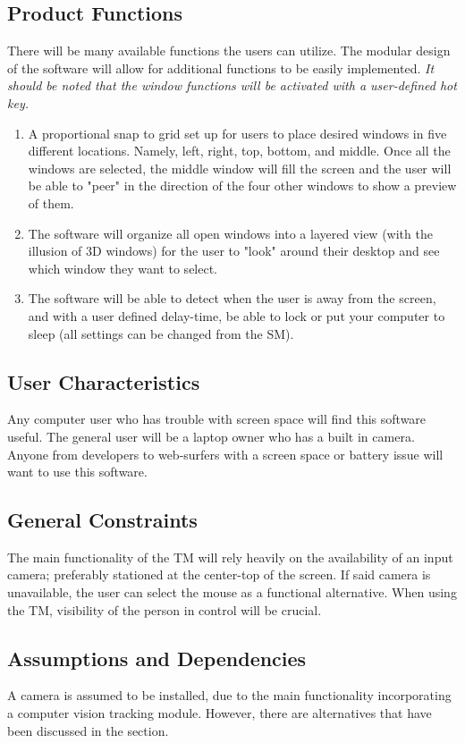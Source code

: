 \documentclass[titlepage]{article}
\begin{document}
\subsection{Product Functions}
There will be many available functions the users can utilize. The modular design of the software will allow for additional functions to be easily implemented. \textit{It should be noted that the window functions will be activated with a user-defined hot key.}
\begin{enumerate}
	\item A proportional snap to grid set up for users to place desired windows in five different locations. Namely, left, right, top, bottom, and middle. Once all the windows are selected, the middle window will fill the screen and the user will be able to "peer" in the direction of the four other windows to show a preview of them. 
	\item The software will organize all open windows into a layered view (with the illusion of 3D windows) for the user to "look" around their desktop and see which window they want to select.
	\item The software will be able to detect when the user is away from the screen, and with a user defined delay-time, be able to lock or put your computer to sleep (all settings can be changed from the SM).
\end{enumerate}

\subsection{User Characteristics}
Any computer user who has trouble with screen space will find this software useful. The general user will be a laptop owner who has a built in camera. Anyone from developers to web-surfers with a screen space or battery issue will want to use this software.

\subsection{General Constraints}
\label{General Constraints}
The main functionality of the TM will rely heavily on the availability of an input camera; preferably stationed at the center-top of the screen. If said camera is unavailable, the user can select the mouse as a functional alternative. When using the TM, visibility of the person in control will be crucial.

\subsection{Assumptions and Dependencies}
A camera is assumed to be installed, due to the main functionality incorporating a computer vision tracking module. However, there are alternatives that have been discussed in the  section.
\end{document}
